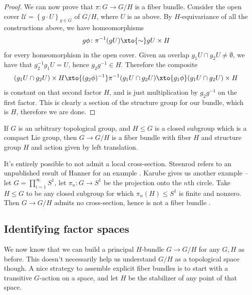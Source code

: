 \documentclass[11pt]{amsart}
\begin{document}
\begin{proof}
We can now prove that $\pi \colon G \to G/H$ is a fiber bundle. Consider the open cover $\mathcal{U} = \left\{ g\cdot U \right\}_{g\in G}$ of $G/H$, where $U$ is as above. By $H$-equivariance of all the constructions above, we have homeomorphisms
\begin{align*}
    g\phi \colon \pi^{-1}(gU) \xto{\sim} gU \times H
\end{align*}
for every homeomorphism in the open cover. Given an overlap $g_1U \cap g_2U \ne \emptyset$, we have that $g_2^{-1}g_1U = U$, hence $g_2 g^{-1} \in H$. Therefore the composite
\begin{align*}
    (g_1 U \cap g_2 U) \times H \xto{(g_2 \phi)^{-1}} \pi^{-1}(g_1 U \cap g_2 U) \xto{g_1 \phi} (g_1 U \cap g_2 U) \times H
\end{align*}
is constant on that second factor $H$, and is just multiplication by $g_2 g^{-1}$ on the first factor. This is clearly a section of the structure group for our bundle, which is $H$, therefore we are done.
\end{proof}

\begin{theorem} If $G$ is an arbitrary topological group, and $H \le G$ is a closed subgroup which is a compact Lie group, then $G \to G/H$ is a fiber bundle with fiber $H$ and structure group $H$ and action given by left translation.
\end{theorem}

\begin{remark} It's entirely possible to not admit a local cross-section. Steenrod refers to an unpublished result of Hanner for an example \cite[p.~33]{Steenrod-fibre-bundles}. Karube gives us another example -- let $G = \prod_{i=1}^\infty S^1$, let $\pi_n \colon G \to S^1$ be the projection onto the $n$th circle. Take $H \le G$ to be any closed subgroup for which $\pi_n(H) \le S^1$ is finite and nonzero. Then $G\to G/H$ admits no cross-section, hence is not a fiber bundle \cite{karubeLocalCrosssectionsLocally1958}.
\end{remark}



\subsection{Identifying factor spaces} We now know that we can build a principal $H$-bundle $G \to G/H$ for any $G,H$ as before. This doesn't necessarily help us understand $G/H$ as a topological space though. A nice strategy to assemble explicit fiber bundles is to start with a transitive $G$-action on a space, and let $H$ be the stabilizer of any point of that space.
\end{document}
